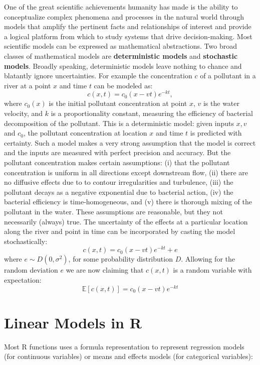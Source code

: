 \documentclass[
]{book}
\begin{document}
One of the great scientific achievements humanity has made is the ability to conceptualize complex phenomena and processes in the natural world through models that amplify the pertinent facts and relationships of interest and provide a logical platform from which to study systems that drive decision-making. Most scientific models can be expressed as mathematical abstractions. Two broad classes of mathematical models are \textbf{deterministic models} and \textbf{stochastic models}. Broadly speaking, deterministic models leave nothing to chance and blatantly ignore uncertainties. For example the concentration \(c\) of a pollutant in a river at a point \(x\) and time \(t\) can be modeled as:
\[
c(x,t)=c_0 (x-vt)e^{-kt},
\]
where \(c_0(x)\) is the initial pollutant concentration at point \(x\), \(v\) is the water velocity, and \(k\) is a proportionality constant, measuring the efficiency of bacterial decomposition of the pollutant. This is a deterministic model: given inputs \(x, v\) and \(c_0\), the pollutant concentration at location \(x\) and time \(t\) is predicted with certainty. Such a model makes a very strong assumption that the model is correct and the inputs are measured with perfect precision and accuracy. But the pollutant concentration makes certain assumptions: (i) that the pollutant concentration is uniform in all directions except downstream flow, (ii) there are no diffusive effects due to to contour irregularities and turbulence, (iii) the pollutant decays as a negative exponential due to bacterial action, (iv) the bacterial efficiency is time-homogeneous, and (v) there is thorough mixing of the pollutant in the water. These assumptions are reasonable, but they not necessarily (always) true. The uncertainty of the effects at a particular location along the river and point in time can be incorporated by casting the model stochastically:
\[
c(x,t) = c_0 (x-vt)e^{-kt} + e
\]
where \(e \sim D(0,\sigma^2)\), for some probability distribution \(D\). Allowing for the random deviation \(e\) we are now claiming that \(c(x,t)\) is a random variable with expectation:
\[
\mathbb E[c(x,t)] = c_0 (x-vt)e^{-kt} 
\]

\hypertarget{linear-models-in-r}{%
\section{Linear Models in R}\label{linear-models-in-r}}

Most R functions uses a formula representation to represent regression models (for continuous variables) or means and effects models (for categorical variables):
\end{document}
